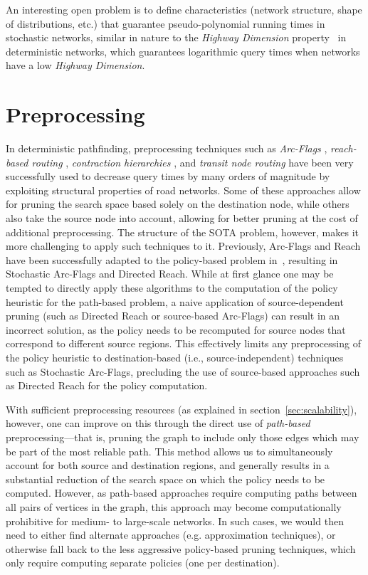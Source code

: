 \documentclass[oribibl]{llncs}
\begin{document}
			An interesting open problem is to define characteristics (network structure, shape of distributions, etc.)
			that guarantee pseudo-polynomial running times in stochastic networks,
			similar in nature to the \textit{Highway Dimension} property~\cite{abraham2010highway}
			in deterministic networks,
			which guarantees logarithmic query times when networks have a low \textit{Highway Dimension}.

	\section{Preprocessing}

		In deterministic pathfinding, preprocessing techniques such as
		\textit{Arc-Flags} \citep{hilger2009fast},
		\textit{reach-based routing} \citep{gutman2004reach,goldberg2006reach},
		\textit{contraction hierarchies} \citep{geisberger2008contraction}, and
		\textit{transit node routing} \citep{bast2006transit}
		have been very successfully used to decrease query times by many orders of magnitude by exploiting
		structural properties of road networks.
		Some of these approaches allow for pruning the search space based solely on the destination node,
		while others also take the source node into account, allowing for better pruning at the cost of
		additional preprocessing. The structure of the SOTA problem, however, makes it more challenging to apply
		such techniques to it.
		Previously, Arc-Flags and Reach have been successfully adapted to the policy-based problem
		in~\citep*{sabran2014precomputation}, resulting in Stochastic Arc-Flags and Directed Reach.
		While at first glance one may be tempted to directly apply these algorithms to the computation of the
		policy heuristic for the path-based problem,
		a naive application of source-dependent pruning (such as Directed Reach or source-based Arc-Flags)
		can result in an incorrect solution,
		as the policy needs to be recomputed for source nodes that correspond to different source regions.
		This effectively limits any preprocessing of the policy heuristic to destination-based
		(i.e., source-independent) techniques such as Stochastic Arc-Flags, precluding the use of source-based
		approaches such as Directed Reach for the policy computation.

		With sufficient preprocessing resources (as explained in section~\ref{sec:scalability}),
		however, one can improve on this through the direct use of \textit{path-based} preprocessing---that is,
		pruning the graph to include only those edges which may be part of the most reliable path.
		This method allows us to simultaneously account for both source and destination regions, and generally
		results in a substantial reduction of the search space on which the policy needs to be computed.
		However, as path-based approaches require computing paths between all  pairs of vertices
		in the graph, this approach may become computationally prohibitive for medium- to large-scale networks.
		In such cases, we would then need to either find alternate approaches (e.g. approximation techniques),
		or otherwise fall back to the less aggressive policy-based pruning techniques,
		which only require computing  separate policies (one per destination).
\end{document}
